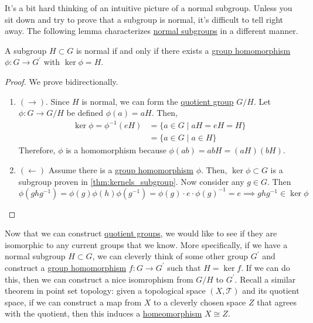   It's a bit hard thinking of an intuitive picture of a normal subgroup. Unless you sit down and try to prove that a subgroup is normal, it's difficult to tell right away. The following lemma characterizes \hyperref[def:normal_subgroup]{normal subgroups} in a different manner. 

  \begin{lemma}
    \label{thm:normal_kernel}
    A subgroup $H \subset G$ is normal if and only if there exists a \hyperref[def:group-homomorphism]{group homomorphism} $\phi: G \rightarrow G^\prime$ with $\ker{\phi} = H$. 
  \end{lemma}
  \begin{proof}
    We prove bidirectionally. 
    \begin{enumerate}
      \item $(\rightarrow)$. Since $H$ is normal, we can form the \hyperref[def:quotient-group]{quotient group} $G/H$. Let $\phi: G \rightarrow G/H$ be defined $\phi(a) = aH$. Then, 
      \begin{align}
        \ker{\phi} = \phi^{-1}(eH) & = \{a \in G \mid aH = eH = H \} \\
                                   & = \{a \in G \mid a \in H \}
      \end{align}
      Therefore, $\phi$ is a homomorphism because $\phi(ab) = abH = (aH)(bH)$.   

      \item $(\leftarrow)$ Assume there is a \hyperref[def:group-homomorphism]{group homomorphism} $\phi$. Then, $\ker{\phi} \subset G$ is a subgroup proven in \ref{thm:kernels_subgroup}. Now consider any $g \in G$. Then 
      \begin{equation}
        \phi(g h g^{-1}) = \phi(g) \phi(h) \phi(g^{-1}) = \phi(g) \cdot e \cdot \phi(g)^{-1} = e \implies g h g^{-1} \in \ker{\phi}
      \end{equation}
    \end{enumerate}
  \end{proof}

  Now that we can construct \hyperref[def:quotient-group]{quotient groups}, we would like to see if they are isomorphic to any current groups that we know. More specifically, if we have a normal subgroup $H \subset G$, we can cleverly think of some other group $G^\prime$ and construct a \hyperref[def:group-homomorphism]{group homomorphism} $f: G \to G^\prime$ such that $H = \ker{f}$. If we can do this, then we can construct a nice isomrophism from $G/H$ to $G^\prime$. Recall a similar theorem in point set topology: given a topological space $(X, \mathscr{T})$ and its quotient space, if we can construct a map from $X$ to a cleverly chosen space $Z$ that agrees with the quotient, then this induces a \hyperref[pst-def:homeomorphism]{homeomorphism} $X \cong Z$. 

